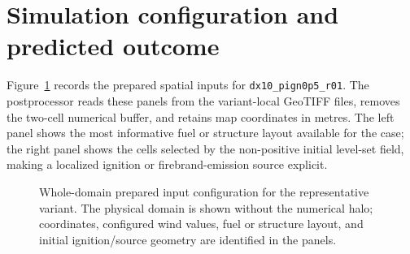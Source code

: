 \section{Simulation configuration and predicted outcome}

Figure~\ref{fig:input-configuration} records the prepared spatial inputs for \texttt{dx10\_pign0p5\_r01}.
The postprocessor reads these panels from the variant-local GeoTIFF files, removes the
two-cell numerical buffer, and retains map coordinates in metres.  The left panel shows
the most informative fuel or structure layout available for the case; the right panel
shows the cells selected by the non-positive initial level-set field, making a localized
ignition or firebrand-emission source explicit.

\begin{figure}[H]
\centering
{}
\caption{Whole-domain prepared input configuration for the representative variant.  The
physical domain is shown without the numerical halo; coordinates, configured wind values,
fuel or structure layout, and initial ignition/source geometry are identified in the panels.}
\label{fig:input-configuration}
\end{figure}

